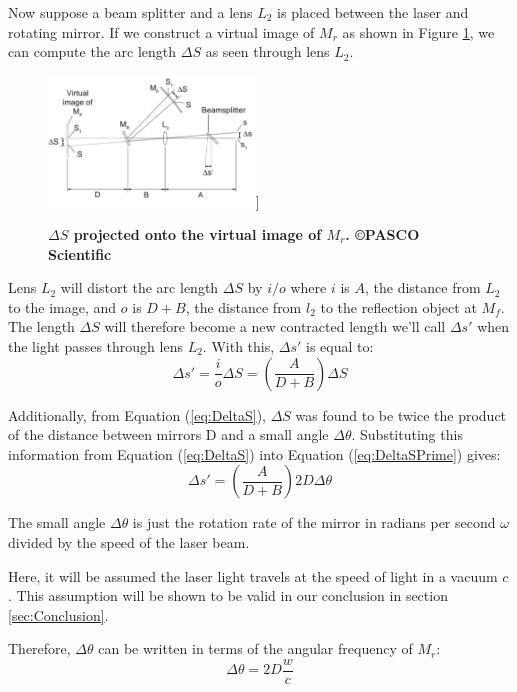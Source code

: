 \documentclass[twocolumn]{article}
\begin{document}
	Now suppose a beam splitter and a lens $L_2$ is placed between the laser and rotating mirror. 
	If we construct a virtual image of $M_r$ as shown in Figure \ref{fig:VirtualImage}, we can compute the arc length $\Delta S$ as seen through lens $L_2$. 
	\begin{figure}[!ht]
		\centering
		\includegraphics[width=0.49\textwidth]{Images/VirtualImageDiagram}]
		\caption{\textbf{$\Delta S$ projected onto the virtual image of $M_r$.\cite{lee_instruction_????} \copyright PASCO Scientific}}
		\label{fig:VirtualImage}
	\end{figure}
	
	Lens $L_2$ will distort the arc length $\Delta S$ by $i/o$ where $i$ is $A$, the distance from $L_2$ to the image, and $o$ is $D + B$, the distance from $l_2$ to the reflection object at $M_f$. 
	The length $\Delta S$ will therefore become a new contracted length we'll call  $\Delta s'$ when the light passes through lens $L_2$. 
	With this, $\Delta s'$ is equal to:
	\begin{equation}
		\Delta s' = \frac{i}{o} \Delta S = (\frac{A}{D+B})\Delta S
		\label{eq:DeltaSPrime}
	\end{equation}
	
	Additionally, from Equation (\ref{eq:DeltaS}), $\Delta S$ was found to be twice the product of the distance between mirrors D and a small angle $\Delta \theta$. Substituting this information from Equation (\ref{eq:DeltaS}) into Equation (\ref{eq:DeltaSPrime}) gives:
	\begin{equation}
		\Delta s' = (\frac{A}{D+B})2D\Delta\theta
		\label{eq:DeltaSPrime2}
	\end{equation}
	
	The small angle $\Delta \theta$ is just the rotation rate of the mirror in radians per second $\omega$ divided by the speed of the laser beam. 
	
	Here, it will be assumed the laser light travels at the speed of light in a vacuum $c$.
	This assumption will be shown to be valid in our conclusion in section \ref{sec:Conclusion}.
	
	Therefore, $\Delta \theta$ can be written in terms of the angular frequency of $M_r$:
	\begin{equation}
		\Delta\theta = 2D\frac{w}{c}
		\label{eq:DeltaTheta}
	\end{equation}
	
\end{document}
